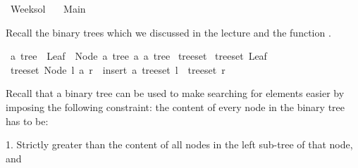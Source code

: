 %
\begin{isabellebody}%
%
%
\isadelimtheory
\isanewline
%
\endisadelimtheory
%
\isatagtheory
{}\isamarkupfalse%
\ Week{\isacharunderscore}{\kern0pt}{}{\isacharunderscore}{\kern0pt}sol\isanewline
\ \ \ Main\isanewline
{}%
\endisatagtheory
{\isafoldtheory}%
%
\isadelimtheory
%
\endisadelimtheory
%
\begin{isamarkuptext}%
\vspace{15ex}%
\end{isamarkuptext}\isamarkuptrue%
%
\begin{isamarkuptext}%
Recall the binary trees which we discussed in the lecture and the function .%
\end{isamarkuptext}\isamarkuptrue%
\isamarkupfalse%
\ {\isacharprime}{\kern0pt}a\ tree\ {\isacharequal}{\kern0pt}\ Leaf\ {\isacharbar}{\kern0pt}\ Node\ {\isachardoublequoteopen}{\isacharprime}{\kern0pt}a\ tree{\isachardoublequoteclose}\ {\isacharprime}{\kern0pt}a\ {\isachardoublequoteopen}{\isacharprime}{\kern0pt}a\ tree{\isachardoublequoteclose}\isanewline
\isanewline
{}\isamarkupfalse%
\ tree{\isacharunderscore}{\kern0pt}set\ \isanewline
{\isachardoublequoteopen}tree{\isacharunderscore}{\kern0pt}set\ Leaf\ {\isacharequal}{\kern0pt}\ {\isacharbraceleft}{\kern0pt}{\isacharbraceright}{\kern0pt}{\isachardoublequoteclose}\isanewline
{\isacharbar}{\kern0pt}\ {\isachardoublequoteopen}tree{\isacharunderscore}{\kern0pt}set\ {\isacharparenleft}{\kern0pt}Node\ l\ a\ r{\isacharparenright}{\kern0pt}\ {\isacharequal}{\kern0pt}\ insert\ a\ {\isacharparenleft}{\kern0pt}tree{\isacharunderscore}{\kern0pt}set\ l{\isacharparenright}{\kern0pt}\ {\isasymunion}\ {\isacharparenleft}{\kern0pt}tree{\isacharunderscore}{\kern0pt}set\ r{\isacharparenright}{\kern0pt}{\isachardoublequoteclose}%
\begin{isamarkuptext}%
%
\end{isamarkuptext}\isamarkuptrue%
%
\begin{isamarkuptext}%
Recall that a binary tree can be used to make searching for elements easier by imposing the
    following constraint: the content  of every node  in the binary tree has to be:

     1. Strictly greater than the content of all nodes in the left sub-tree  of that node, and


\end{isamarkuptext}
\end{isabellebody}

